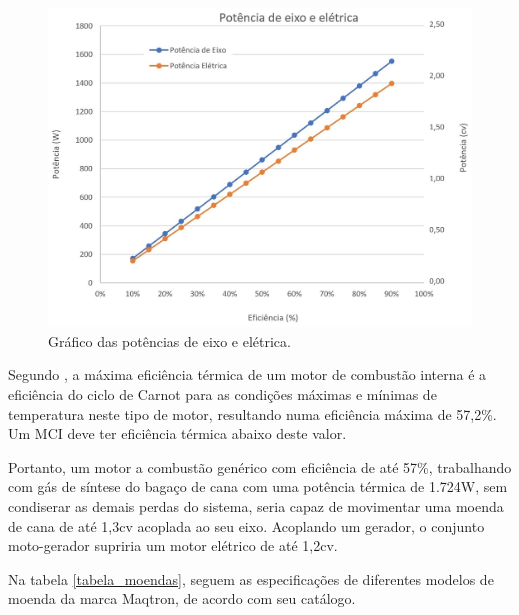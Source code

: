 \begin{figure}[!htb]
	\centering
	\includegraphics[width=13.5cm]{Figuras/grafico_potencia_eficiencia}
	\caption{Gráfico das potências de eixo e elétrica.}
	\label{grafico_potencia_eficiencia}
\end{figure}

Segundo \cite{brunetti2012}, a máxima eficiência térmica de um motor de combustão interna é a eficiência do ciclo de Carnot para as condições máximas e mínimas de temperatura neste tipo de motor, resultando numa eficiência máxima de 57,2\%. Um MCI deve ter eficiência térmica abaixo deste valor.

Portanto, um motor a combustão genérico com eficiência de até 57\%, trabalhando com gás de síntese do bagaço de cana com uma potência térmica de 1.724W, sem condiserar as demais perdas do sistema, seria capaz de movimentar uma moenda de cana de até 1,3cv acoplada ao seu eixo. Acoplando um gerador, o conjunto moto-gerador supriria um motor elétrico de até 1,2cv.

Na tabela \ref{tabela_moendas}, seguem as especificações de diferentes modelos de moenda da marca Maqtron, de acordo com seu catálogo.

